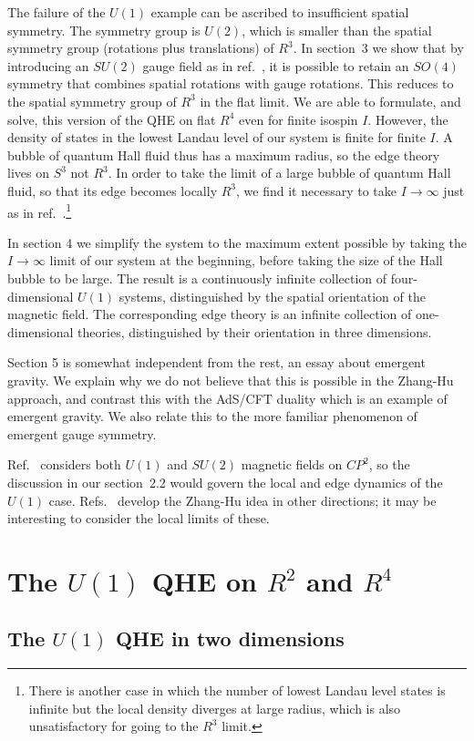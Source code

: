 \documentclass[a4paper,12pt]{article}
\newcommand{\R}{R}
\newcommand{\sect}[1]{\section{#1}\setcounter{equation}{0}}
\begin{document}
The failure of the
$U(1)$ example can be ascribed to insufficient spatial symmetry.  The
symmetry group is $U(2)$, which is smaller than the spatial symmetry group
(rotations plus translations) of
$\R^3$.  In section~3 we show that by introducing an $SU(2)$ gauge field as
in ref.~\cite{hz1}, it is possible to retain an $SO(4)$ symmetry that
combines spatial rotations with gauge rotations.  This reduces to the spatial 
symmetry group of $\R^3$ in the flat limit.  We are able to
formulate, and solve, this version of the QHE on flat $\R^4$ even for
finite isospin
$I$.  However, the
density of states in the lowest Landau level of our system is finite for
finite $I$.
A bubble of quantum Hall fluid thus has a maximum radius, so the
edge theory lives on $S^3$ not $\R^3$. In order to take the limit of a large
bubble of quantum Hall fluid, so that its edge becomes locally $\R^3$, we find
it necessary to take
$I \to \infty$ just as in ref.~\cite{hz1}.\footnote{There is another case in
which the number of lowest Landau level states is infinite but the local
density diverges at large radius, which is also unsatisfactory for going to
the $\R^3$ limit.}

In section 4 we simplify the system to the maximum extent possible by
taking the $I \to \infty$ limit of our system at the beginning, before taking
the size of the Hall bubble to be large.  The result is a continuously
infinite collection of four-dimensional $U(1)$ systems, distinguished by the
spatial orientation of the magnetic field.  The corresponding edge theory is
an infinite collection of one-dimensional theories, distinguished by their
orientation in three dimensions.

Section 5 is somewhat independent from the rest, an essay about emergent
gravity.  We explain why we do not believe that this is possible in the
Zhang-Hu approach, and contrast this with the AdS/CFT duality which is an
example of emergent gravity.  We also relate this to the more familiar
phenomenon of emergent gauge symmetry.

Ref.~\cite{kara} considers both $U(1)$ and $SU(2)$ magnetic fields on $CP^2$,
so the discussion in our section~2.2 would govern the local and edge
dynamics of the $U(1)$ case.  Refs.~\cite{followup} develop the Zhang-Hu
idea in other directions; it may be interesting to consider the local limits of
these.


\sect{The $U(1)$ QHE on $\R^2$ and $\R^4$}

\subsection{The $U(1)$ QHE in two dimensions}
\end{document}

